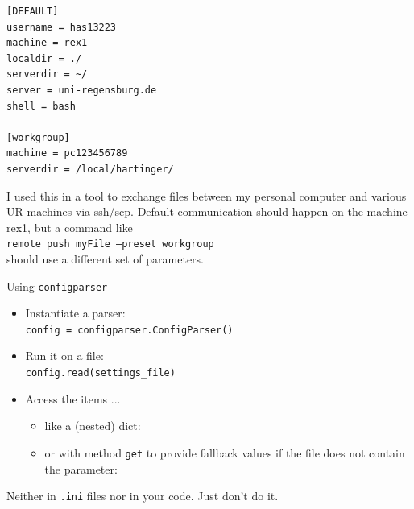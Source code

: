 \begin{frame}[fragile]
%
\begin{codebox}
\begin{verbatim}
[DEFAULT]
username = has13223
machine = rex1
localdir = ./
serverdir = ~/
server = uni-regensburg.de
shell = bash

[workgroup]
machine = pc123456789
serverdir = /local/hartinger/
\end{verbatim}
\end{codebox}
%
\begin{hintbox}[Context]
\footnotesize
I used this in a tool to exchange files between my personal computer and various UR machines via ssh/scp. Default communication should happen on the machine rex1, but a command like \\
\texttt{remote push myFile --preset workgroup} \\
should use a different set of parameters.
\end{hintbox}
%
\end{frame}


\begin{frame}{Using \texttt{configparser}}
%
\begin{itemize}
\item Instantiate a parser:\\
	\texttt{config = configparser.ConfigParser()}
\item Run it on a file:\\
	\texttt{config.read(settings\_file)}
\item Access the items ...
	\begin{itemize}
	\item like a (nested) dict: \\
	\item or with method \texttt{get} to provide fallback values if the file does not contain the parameter: \\
	\end{itemize}
\end{itemize}
%
\begin{warnbox}
\footnotesize
Neither in \texttt{.ini} files nor in your code. Just don't do it.
\end{warnbox}
%
\end{frame}

